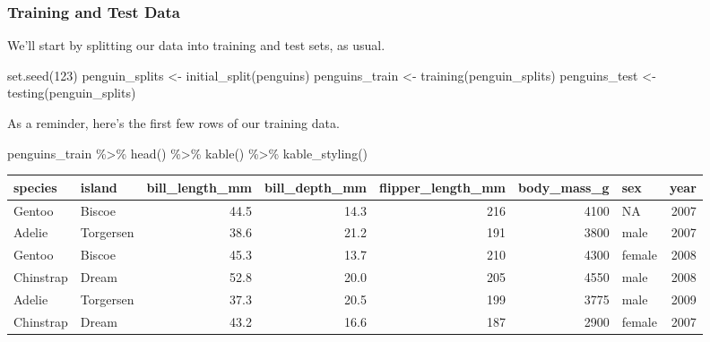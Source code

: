 \documentclass[
  letterpaper,
  DIV=11,
  numbers=noendperiod]{scrartcl}
\newenvironment{Shaded}{\begin{snugshade}}{\end{snugshade}}
\newcommand{\DecValTok}[1]{\textcolor[rgb]{0.68,0.00,0.00}{#1}}
\newcommand{\FunctionTok}[1]{\textcolor[rgb]{0.28,0.35,0.67}{#1}}
\newcommand{\NormalTok}[1]{\textcolor[rgb]{0.00,0.23,0.31}{#1}}
\newcommand{\OtherTok}[1]{\textcolor[rgb]{0.00,0.23,0.31}{#1}}
\newcommand{\SpecialCharTok}[1]{\textcolor[rgb]{0.37,0.37,0.37}{#1}}
\begin{document}
\subsubsection{Training and Test Data}\label{training-and-test-data}

We'll start by splitting our data into training and test sets, as usual.

\begin{Shaded}
\begin{Highlighting}[]
\FunctionTok{set.seed}\NormalTok{(}\DecValTok{123}\NormalTok{)}
\NormalTok{penguin\_splits }\OtherTok{\textless{}{-}} \FunctionTok{initial\_split}\NormalTok{(penguins)}
\NormalTok{penguins\_train }\OtherTok{\textless{}{-}} \FunctionTok{training}\NormalTok{(penguin\_splits)}
\NormalTok{penguins\_test }\OtherTok{\textless{}{-}} \FunctionTok{testing}\NormalTok{(penguin\_splits)}
\end{Highlighting}
\end{Shaded}

As a reminder, here's the first few rows of our training data.

\begin{Shaded}
\begin{Highlighting}[]
\NormalTok{penguins\_train }\SpecialCharTok{\%\textgreater{}\%}
  \FunctionTok{head}\NormalTok{() }\SpecialCharTok{\%\textgreater{}\%}
  \FunctionTok{kable}\NormalTok{() }\SpecialCharTok{\%\textgreater{}\%}
  \FunctionTok{kable\_styling}\NormalTok{()}
\end{Highlighting}
\end{Shaded}

\begin{longtable}[t]{llrrrrlr}
\toprule
species & island & bill\_length\_mm & bill\_depth\_mm & flipper\_length\_mm & body\_mass\_g & sex & year\\
\midrule
Gentoo & Biscoe & 44.5 & 14.3 & 216 & 4100 & NA & 2007\\
Adelie & Torgersen & 38.6 & 21.2 & 191 & 3800 & male & 2007\\
Gentoo & Biscoe & 45.3 & 13.7 & 210 & 4300 & female & 2008\\
Chinstrap & Dream & 52.8 & 20.0 & 205 & 4550 & male & 2008\\
Adelie & Torgersen & 37.3 & 20.5 & 199 & 3775 & male & 2009\\
\addlinespace
Chinstrap & Dream & 43.2 & 16.6 & 187 & 2900 & female & 2007\\
\bottomrule
\end{longtable}
\end{document}
